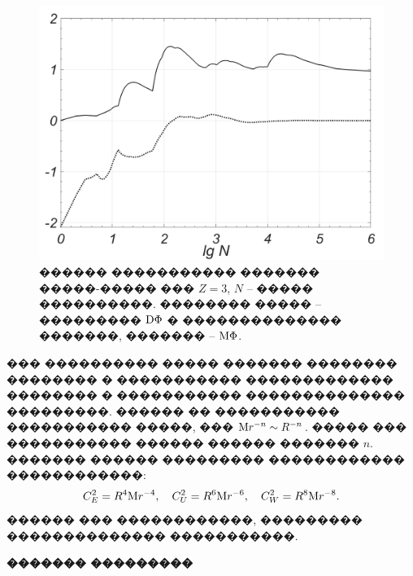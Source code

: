 \documentclass[12pt,titlepage]{article}
\newcommand\M{{\rm M}} %
\newcommand\D{{\rm D}}
\begin{document}
\begin{figure}[h!] %
\centerline{
\includegraphics[width=0.7\linewidth]{Monte-Carlo.png}
}
\caption{������ ����������� ������� �����-����� ��� $Z=3$, $N$ -- ����� ����������. �������� ����� -- ��������� $\D \Phi$ � �������������� �������, ������� -- $\M \Phi$.} \label{figMC}
\end{figure} %

��� ���������� ����� ������� �������� �������� � ����������� ������������� �������� � ����������� �������������� ���������. ������ �� ����������� ����������� �����, ��� $\M r^{-n} \sim R^{-n}$. ����� ��� ����������� ������ ������ ������� $n$. ������� ������ ��������� ������������ ������������:
\begin{equation}
    \label{coeff_def}
    C_E^2 = R^4 \M r^{-4}, \quad C_U^2 = R^6 \M r^{-6}, \quad C_W^2 = R^8 \M r^{-8}.
\end{equation}
������ ��� ������������, ��������� �������������� �����������.

\newpage

\textbf{������� ���������}
\end{document}
